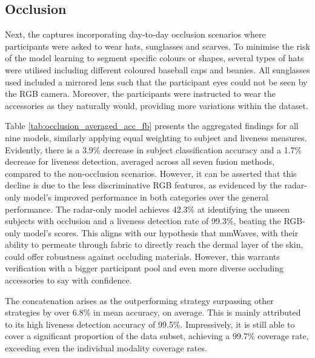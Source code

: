 \documentclass{mpaper}
\begin{document}
\subsection{Occlusion}
Next, the captures incorporating day-to-day occlusion scenarios where participants were asked to wear hats, sunglasses and scarves. To minimise the risk of the model learning to segment specific colours or shapes, several types of hats were utilised including different coloured baseball caps and beanies. All sunglasses used included a mirrored lens such that the participant eyes could not be seen by the RGB camera. Moreover, the participants were instructed to wear the accessories as they naturally would, providing more variations within the dataset.

Table \ref{tab:occlusion_averaged_acc_fb} presents the aggregated findings for all nine models, similarly applying equal weighting to subject and liveness measures. Evidently, there is a 3.9\% decrease in subject classification accuracy and a 1.7\% decrease for liveness detection, averaged across all seven fusion methods, compared to the non-occlusion scenarios. However, it can be asserted that this decline is due to the less discriminative RGB features, as evidenced by the radar-only model's improved performance in both categories over the general performance. The radar-only model achieves 42.3\% at identifying the unseen subjects with occlusion and a liveness detection rate of 99.3\%, beating the RGB-only model's scores. This aligns with our hypothesis that mmWaves, with their ability to permeate through fabric to directly reach the dermal layer of the skin, could offer robustness against occluding materials. However, this warrants verification with a bigger participant pool and even more diverse occluding accessories to say with confidence.

The concatenation arises as the outperforming strategy surpassing other strategies by over 6.8\% in mean accuracy, on average. This is mainly attributed to its high liveness detection accuracy of 99.5\%. Impressively, it is still able to cover a significant proportion of the data subset, achieving a 99.7\% coverage rate, exceeding even the individual modality coverage rates. 
\end{document}
